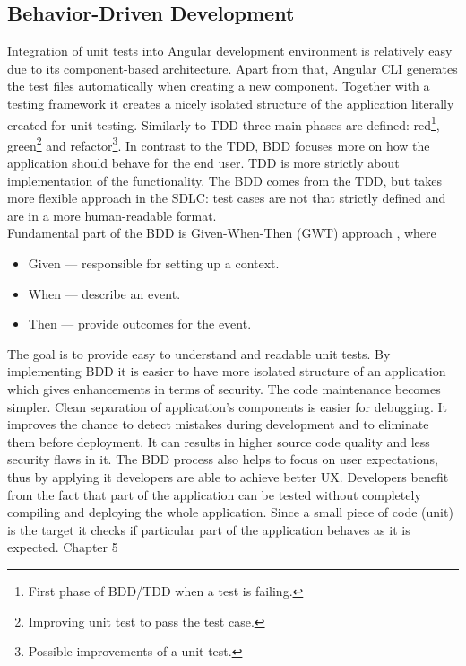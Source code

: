 \documentclass{article} %
\begin{document}
\subsection{Behavior-Driven Development}
Integration of unit tests into Angular development environment is relatively easy due to its component-based architecture. Apart from that, Angular CLI generates the test files automatically when creating a new component. Together with a testing framework it creates a nicely isolated structure of the application literally created for unit testing. Similarly to TDD three main phases are defined: red\footnote{First phase of BDD/TDD when a test is failing.}, green\footnote{Improving unit test to pass the test case.} and refactor\footnote{Possible improvements of a unit test.}. In contrast to the TDD, BDD focuses more on how the application should behave for the end user. TDD is more strictly about implementation of the functionality. The BDD comes from the TDD, but takes more flexible approach in the SDLC: test cases are not that strictly defined and are in a more human-readable format.\\
\newline
Fundamental part of the BDD is Given-When-Then (GWT) approach \cite{bib:gwt_approach}, where
\begin{itemize}
    \item Given --- responsible for setting up a context.
    \item When --- describe an event.
    \item Then --- provide outcomes for the event.
\end{itemize}
The goal is to provide easy to understand and readable unit tests. By implementing BDD it is easier to have more isolated structure of an application which gives enhancements in terms of security. The code maintenance becomes simpler. Clean separation of application's components is easier for debugging. It improves the chance to detect mistakes during development and to eliminate them before deployment. It can results in higher source code quality and less security flaws in it. The BDD process also helps to focus on user expectations, thus by applying it developers are able to achieve better UX. Developers benefit from the fact that part of the application can be tested without completely compiling and deploying the whole application. Since a small piece of code (unit) is the target it checks if particular part of the application behaves as it is expected.
\newpage
\huge Chapter 5
\end{document}
